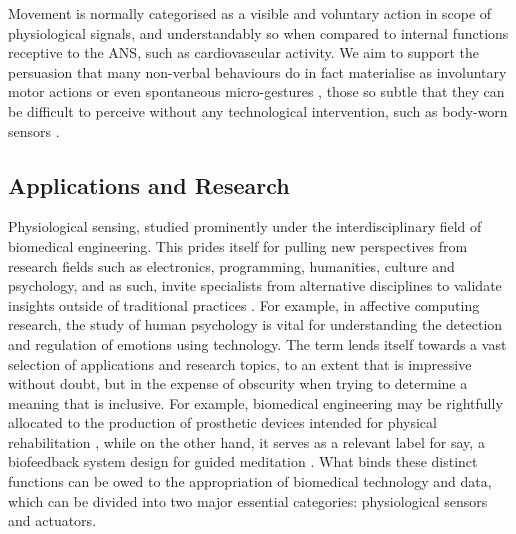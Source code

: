 Movement is normally categorised as a visible and voluntary action in scope of physiological signals, and understandably so when compared to internal functions receptive to the ANS, such as cardiovascular activity. We aim to support the persuasion that many non-verbal behaviours do in fact materialise as involuntary motor actions \cite{haueisen_involuntary_2001} or even spontaneous micro-gestures \cite{chen_analyze_2019}, those so subtle that they can be difficult to perceive without any technological intervention, such as body-worn sensors \cite{jensenius2017exploring}.




\subsection{Applications and Research}

Physiological sensing, studied prominently under the interdisciplinary field of biomedical engineering. This prides itself for pulling new perspectives from research fields such as electronics, programming, humanities, culture and psychology, and as such, invite specialists from alternative disciplines to validate insights outside of traditional practices \cite{enderle_introduction_2012}. For example, in affective computing research, the study of human psychology is vital for understanding the detection and regulation of emotions using technology. The term lends itself towards a vast selection of applications and research topics, to an extent that is impressive without doubt, but in the expense of obscurity when trying to determine a meaning that is inclusive. For example, biomedical engineering may be rightfully allocated to the production of prosthetic devices intended for physical rehabilitation \cite{valentinuzzi_physical_2019}, while on the other hand, it serves as a relevant label for say, a biofeedback system design for guided meditation \cite{foo_soft_2020}. What binds these distinct functions can be owed to the appropriation of biomedical technology and data, which can be divided into two major essential categories: physiological sensors and actuators.

